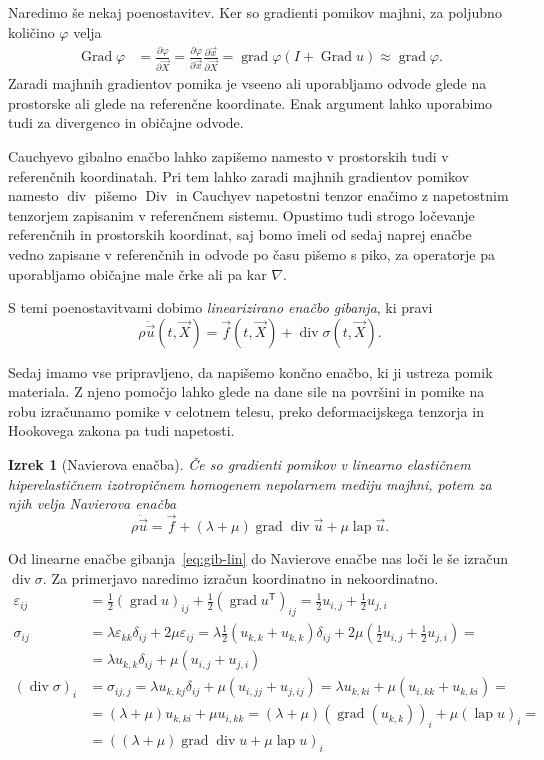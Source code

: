 \documentclass[12pt,a4paper]{article}
\theoremstyle{definition} %
\theoremstyle{plain} %
\newtheorem{izrek}[definicija]{Izrek}
\numberwithin{equation}{section}
\newcommand{\T}{\mathsf{T}}
\newcommand{\lap}{\operatorname{lap}}
\renewcommand{\div}{\operatorname{div}}
\newcommand{\grad}{\operatorname{grad}}
\newcommand{\Div}{\operatorname{Div}}
\newcommand{\Grad}{\operatorname{Grad}}
\renewcommand{\phi}{\varphi}
\newcommand{\eps}{\varepsilon}
\newcommand{\dpar}[2]{\ensuremath{\frac{\partial #1}{\partial #2}}}
\newcommand{\vu}{\vec{u}}
\newcommand{\vf}{\vec{f}}
\newcommand{\vX}{\vec{X}}
\newcommand{\vx}{\vec{x}}
\newcommand{\ts}{\sigma}
\begin{document}
Naredimo še nekaj poenostavitev. Ker so gradienti pomikov majhni,
za poljubno količino $\phi$ velja
\begin{align*}
  \Grad\phi &= \dpar{\phi}{\vX} = \dpar{\phi}{\vx} \dpar{\vx}{\vX} = \grad\phi
  (I + \Grad u) \approx \grad \phi.
\end{align*}
Zaradi majhnih gradientov pomika je vseeno ali uporabljamo odvode glede na
prostorske ali glede na referenčne koordinate. Enak argument lahko uporabimo
tudi za divergenco in običajne odvode.

Cauchyevo gibalno enačbo lahko zapišemo namesto v prostorskih tudi v referenčnih
koordinatah. Pri tem lahko zaradi majhnih gradientov pomikov namesto $\div$
pišemo $\Div$ in Cauchyev napetostni tenzor enačimo z napetostnim tenzorjem
zapisanim v referenčnem sistemu. Opustimo tudi strogo ločevanje referenčnih in
prostorskih koordinat, saj bomo imeli od sedaj naprej enačbe vedno zapisane v
referenčnih in odvode po času pišemo s piko, za operatorje pa uporabljamo
običajne male črke ali pa kar $\nabla$.

S temi poenostavitvami dobimo \emph{linearizirano enačbo gibanja}, ki pravi
\begin{equation}
  \rho \ddot{\vu}(t, \vX) = \vf(t, \vX) + \div\sigma(t, \vX).
  \label{eq:gib-lin}
\end{equation}

Sedaj imamo vse pripravljeno, da napišemo končno enačbo, ki ji ustreza pomik
materiala. Z njeno pomočjo lahko glede na dane sile na površini in pomike na
robu izračunamo pomike v celotnem telesu, preko deformacijskega tenzorja in
Hookovega zakona pa tudi napetosti.
\begin{izrek}[Navierova enačba]
  Če so gradienti pomikov v linearno elastičnem hiperelastičnem
  izotropičnem homogenem nepolarnem mediju majhni, potem za njih velja
  \emph{Navierova enačba}
  \begin{equation}
    \rho \ddot{\vu} = \vf + (\lambda + \mu)\grad\div \vu + \mu \lap \vu.
    \label{eq:navier}
  \end{equation}
\end{izrek}
\proof
Od linearne enačbe gibanja~\eqref{eq:gib-lin} do Navierove enačbe nas loči le še
izračun $\div \sigma$. Za primerjavo naredimo izračun koordinatno in
nekoordinatno.
\begin{align*}
  \eps_{ij} &= \frac12 (\grad u)_{ij} + \frac12 (\grad u^\T)_{ij} =
  \frac12 u_{i,j} + \frac12 u_{j,i} \\
  \ts_{ij} &= \lambda \eps_{kk} \delta_{ij} + 2 \mu \eps_{ij} =
  \lambda \frac{1}{2} (u_{k,k} + u_{k,k}) \delta_{ij} + 2 \mu( \frac12 u_{i,j} +
  \frac12 u_{j,i}) =  \\ &= \lambda u_{k, k}\delta_{ij} + \mu (u_{i,j} +u_{j,i})
  \\
  (\div \ts)_i &= \sigma_{ij,j} = \lambda u_{k, kj}\delta_{ij} + \mu (u_{i,jj}
+u_{j,ij}) = \lambda u_{k,ki} + \mu (u_{i,kk} + u_{k,ki}) = \\
&= (\lambda + \mu)u_{k,ki} + \mu u_{i,kk} = (\lambda+\mu)(\grad(u_{k,k}))_i +
\mu (\lap u)_i = \\ &=
((\lambda + \mu)\grad\div u + \mu \lap u)_i
\end{align*}
\end{document}
